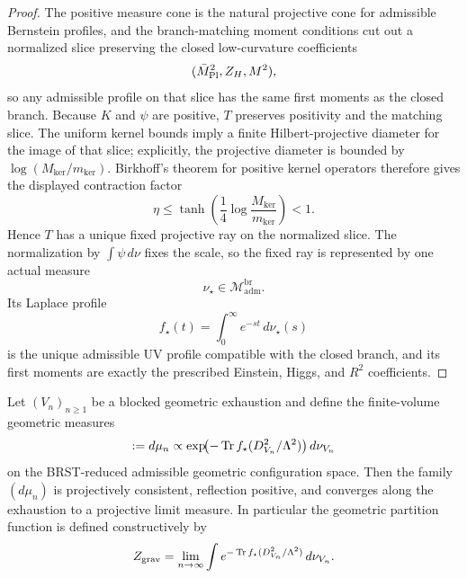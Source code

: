 \begin{proof}
The positive measure cone is the natural projective cone for admissible Bernstein profiles, and the
branch-matching moment conditions cut out a normalized slice preserving the closed low-curvature
coefficients
\[
(\bar M_{\mathrm{Pl}}^2,Z_H,M^2),
\]
so any admissible profile on that slice has the same first moments as the closed branch. Because
$K$ and $\psi$ are positive, $T$ preserves positivity and the matching slice. The uniform kernel
bounds imply a finite Hilbert-projective diameter for the image of that slice; explicitly, the
projective diameter is bounded by $\log(M_{\mathrm{ker}}/m_{\mathrm{ker}})$. Birkhoff's theorem for
positive kernel operators therefore gives the displayed contraction factor
\[
\eta\le \tanh\!\left(\frac14\log\frac{M_{\mathrm{ker}}}{m_{\mathrm{ker}}}\right)<1.
\]
Hence $T$ has a unique fixed projective ray on the normalized slice. The normalization by
$\int\psi\,d\nu$ fixes the scale, so the fixed ray is represented by one actual measure
\[
\nu_\star\in\mathcal M_{\mathrm{adm}}^{\mathrm{br}}.
\]
Its Laplace profile
\[
f_\star(t)=\int_0^\infty e^{-st}\,d\nu_\star(s)
\]
is the unique admissible UV profile compatible with the closed branch, and its first moments are
exactly the prescribed Einstein, Higgs, and $R^2$ coefficients.
\end{proof}

\begin{theorem}
\label{thm:constructive-geometric-measure}
Let $(V_n)_{n\ge 1}$ be a blocked geometric exhaustion and define the finite-volume geometric
measures
\[
:=
d\mu_n
\propto
\exp\!\bigl(-\operatorname{Tr} f_\star(D_{V_n}^2/\Lambda^2)\bigr)\,d\nu_{V_n}
\]
on the BRST-reduced admissible geometric configuration space. Then the family $(d\mu_n)$ is
projectively consistent, reflection positive, and converges along the exhaustion to a projective
limit measure. In particular the geometric partition function is defined constructively by
\[
Z_{\mathrm{grav}}
=
\lim_{n\to\infty}
\int e^{-\operatorname{Tr} f_\star(D_{V_n}^2/\Lambda^2)}\,d\nu_{V_n}.
\]
\end{theorem}

